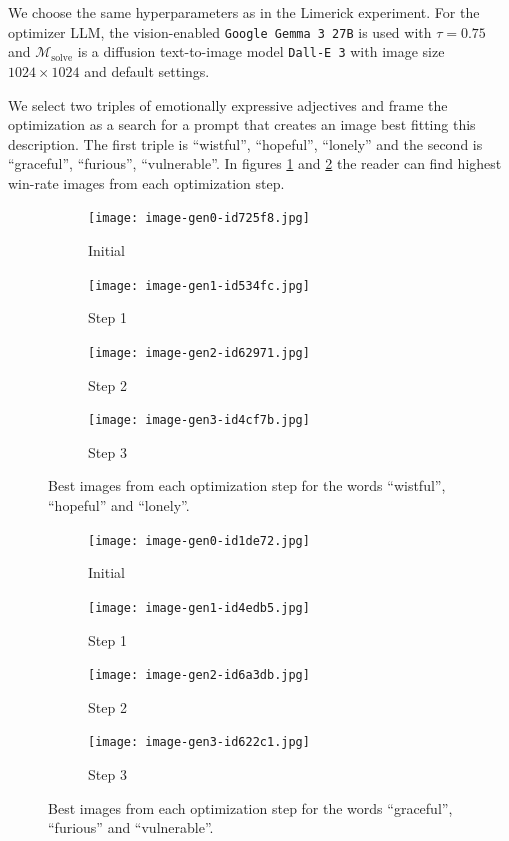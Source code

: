 We choose the same hyperparameters as in the Limerick experiment. For the optimizer LLM, the vision-enabled \texttt{Google Gemma 3 27B} is used with $\tau = 0.75$ and 
$\mathcal{M}_{\text{solve}}$ is a diffusion text-to-image model \texttt{Dall-E 3} with image size $1024\times1024$ and default settings.

We select two triples of emotionally expressive adjectives and frame the optimization as a search for a prompt that creates an image best fitting this description. 
The first triple is ``wistful'', ``hopeful'', ``lonely'' and the second is ``graceful'', ``furious'', ``vulnerable''. In figures \ref{fig:wistful} and \ref{fig:graceful} the reader can find
highest win-rate images from each optimization step.


\begin{figure}[htbp]
    \centering

    \begin{subfigure}{0.24\linewidth}
        \texttt{[image: image-gen0-id725f8.jpg]}
        \caption{Initial}
    \end{subfigure}
    \hfill
    \begin{subfigure}{0.24\linewidth}
        \texttt{[image: image-gen1-id534fc.jpg]}
        \caption{Step 1}
    \end{subfigure}
    \hfill
    \begin{subfigure}{0.24\linewidth}
        \texttt{[image: image-gen2-id62971.jpg]}
        \caption{Step 2}
    \end{subfigure}
    \hfill
    \begin{subfigure}{0.24\linewidth}
        \texttt{[image: image-gen3-id4cf7b.jpg]}
        \caption{Step 3}
    \end{subfigure}

    \caption{Best images from each optimization step for the words ``wistful'', ``hopeful'' and ``lonely''.}
    \label{fig:wistful}
\end{figure}

\begin{figure}[htbp]
    \centering

    \begin{subfigure}{0.24\linewidth}
        \texttt{[image: image-gen0-id1de72.jpg]}
        \caption{Initial}
    \end{subfigure}
    \hfill
    \begin{subfigure}{0.24\linewidth}
        \texttt{[image: image-gen1-id4edb5.jpg]}
        \caption{Step 1}
    \end{subfigure}
    \hfill
    \begin{subfigure}{0.24\linewidth}
        \texttt{[image: image-gen2-id6a3db.jpg]}
        \caption{Step 2}
    \end{subfigure}
    \hfill
    \begin{subfigure}{0.24\linewidth}
        \texttt{[image: image-gen3-id622c1.jpg]}
        \caption{Step 3}
    \end{subfigure}

    \caption{Best images from each optimization step for the words ``graceful'', ``furious'' and ``vulnerable''.}
    \label{fig:graceful}
\end{figure}

